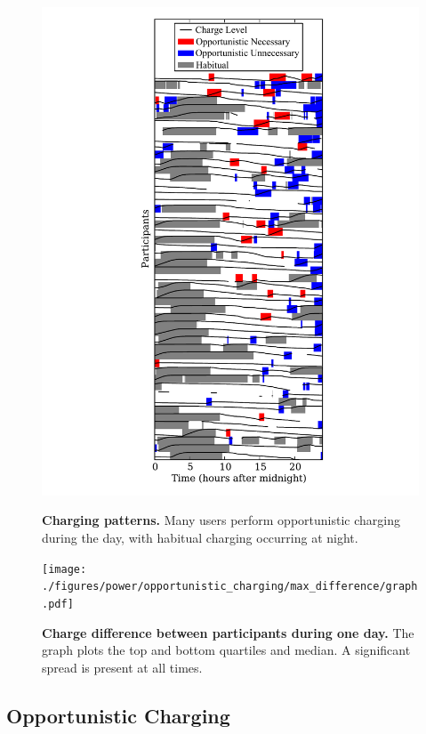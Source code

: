 \begin{figure}[htb!]

\centering
\includegraphics[width=0.75\columnwidth]{./figures/power/opportunistic_charging/count_and_by_time/graph.pdf}

\vspace*{-0.05in}

\caption{\textbf{Charging patterns.} Many users perform opportunistic
charging during the day, with habitual charging occurring at night.}

\label{fig-opportunistic-patterns}

\vspace*{0.1in}

\centering
\texttt{[image: ./figures/power/opportunistic\_charging/max\_difference/graph.pdf]}

\caption{\textbf{Charge difference between participants during one day.} The
graph plots the top and bottom quartiles and median. A significant spread is
present at all times.}

\label{fig-opportunistic-spread}

\vspace*{-0.3in}

\end{figure}

\subsection{Opportunistic Charging}
\label{subsec-opportunistic}

